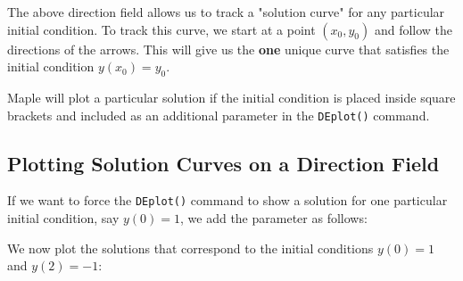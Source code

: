 The above direction field allows us to track a "solution curve" for any particular initial condition. To track this curve, we start at a point $(x_0, y_0)$ and follow the directions of the arrows. This will give us the \textbf{one} unique curve that satisfies the initial condition $y(x_0)=y_0$. 

Maple will plot a particular solution if the initial condition is placed inside square brackets and included as an additional parameter in the \texttt{DEplot()} command.

\subsection{Plotting Solution Curves on a Direction Field}


If we want to force the \texttt{DEplot()} command to show a solution for one particular initial condition, say $y(0)=1$, we add the parameter as follows:

\begin{maplegroup}
\begin{mapleinput}
\end{mapleinput}
\mapleresult
{}
\end{maplegroup}

We now plot the solutions that correspond to the initial conditions $y(0)=1$ and $y(2)=-1$:

\begin{maplegroup}
\begin{mapleinput}
\end{mapleinput}
\mapleresult
{}
\end{maplegroup}

